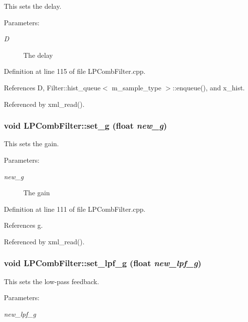 This sets the delay. \begin{Desc}
\item[Parameters:]
\begin{description}
\item[{\em D}]The delay \end{description}
\end{Desc}


Definition at line 115 of file LPComb\-Filter.cpp.

References D, Filter::hist\_\-queue$<$ m\_\-sample\_\-type $>$::enqueue(), and x\_\-hist.

Referenced by xml\_\-read().\hypertarget{classLPCombFilter_a6}{
\subsubsection[set\_\-g]{\setlength{\rightskip}{0pt plus 5cm}void LPComb\-Filter::set\_\-g (float {\em new\_\-g})}}
\label{classLPCombFilter_a6}


This sets the gain. \begin{Desc}
\item[Parameters:]
\begin{description}
\item[{\em new\_\-g}]The gain \end{description}
\end{Desc}


Definition at line 111 of file LPComb\-Filter.cpp.

References g.

Referenced by xml\_\-read().\hypertarget{classLPCombFilter_a8}{
\subsubsection[set\_\-lpf\_\-g]{\setlength{\rightskip}{0pt plus 5cm}void LPComb\-Filter::set\_\-lpf\_\-g (float {\em new\_\-lpf\_\-g})}}
\label{classLPCombFilter_a8}


This sets the low-pass feedback. \begin{Desc}
\item[Parameters:]
\begin{description}
\item[{\em new\_\-lpf\_\-g}]\end{description}
\end{Desc}


